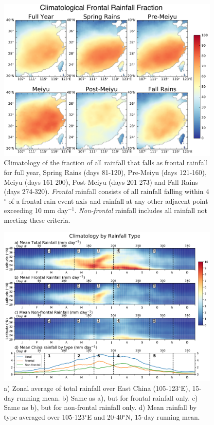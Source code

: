 \documentclass[singlecolumn,11pt]{pnas-new}
\begin{document}
\begin{figure}[htb]
\centering
\noindent\includegraphics[width=38pc]{Figures/frontal_frac_climo}
\caption{Climatology of the fraction of all rainfall that falls as frontal rainfall for full year, Spring Rains (days 81-120), Pre-Meiyu (days 121-160), Meiyu (days 161-200), Post-Meiyu (days 201-273) and Fall Rains (days 274-320). \textit{Frontal} rainfall consists of all rainfall falling within 4$^{\circ}$ of a frontal rain event axis and rainfall at any other adjacent point exceeding 10 mm day$^{-1}$. \textit{Non-frontal} rainfall includes all rainfall not meeting these criteria.}
\label{fig:banded_frac_climo}
\end{figure}

\begin{figure}[htbp]
\centering
\noindent\includegraphics[width=39pc]{Figures/hov_types_climo}
\caption{a) Zonal average of total rainfall over East China (105-123$^{\circ}$E), 15-day running mean. b) Same as a), but for frontal rainfall only. c) Same as b), but for non-frontal rainfall only. d) Mean rainfall by type averaged over 105-123$^{\circ}$E and 20-40$^{\circ}$N, 15-day running mean.}
\label{fig:type_hov}
\end{figure}
\end{document}
